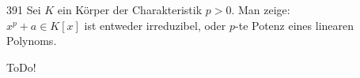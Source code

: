 \begin{algebraUE}{391}
Sei $K$ ein Körper der Charakteristik $p > 0$. Man zeige: \\
$x^p + a \in K[x]$ ist entweder irreduzibel, oder $p$-te Potenz eines linearen
Polynoms.
\end{algebraUE}

\begin{solution}

ToDo!

\end{solution}
